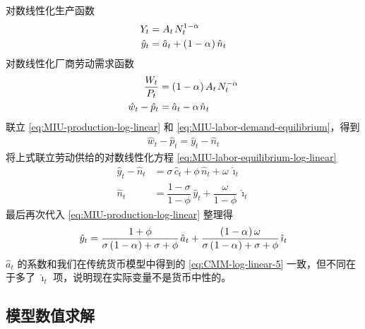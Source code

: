 对数线性化生产函数
\begin{align}
    Y_t&=A_t\,N_t^{1-\alpha}\notag\\
    \hat y_t&=\hat a_t+\bka{1-\alpha}\hat n_t\label{eq:MIU-production-log-linear}
\end{align}
对数线性化厂商劳动需求函数
\begin{align}
    \dfrac{W_t}{P_t}&=\bka{1-\alpha}A_t\,N^{-\alpha}_t\notag\\
    \hat w_t-\hat p_t&=\hat a_t-\alpha\,\hat n_t\label{eq:MIU-labor-demand-equilibrium}
\end{align}
联立 \ref{eq:MIU-production-log-linear} 和 \ref{eq:MIU-labor-demand-equilibrium}，得到
\begin{align}
    \hat w_t-\hat p_t=\hat y_t-\hat n_t\label{eq:MIU-production-labor-demand-log-linear}
\end{align}
将上式联立劳动供给的对数线性化方程 \ref{eq:MIU-labor-equilibrium-log-linear}
\begin{align*}
    \hat y_t-\hat n_t&=\sigma\,\hat c_t+\phi\,\hat n_t+\omega\,\hat\imath_t\\
    \hat n_t&=\dfrac{1-\sigma}{1-\phi}\,\hat y_t+\dfrac{\omega}{1-\phi}\,\hat\imath_t
\end{align*}
最后再次代入 \ref{eq:MIU-production-log-linear} 整理得
\begin{align*}
    \hat y_t=\dfrac{1+\phi}{\sigma\bka{1-\alpha}+\sigma+\phi}\,\hat a_t+\dfrac{\bka{1-\alpha}\omega}{\sigma\bka{1-\alpha}+\sigma+\phi}\,\hat\imath_t
\end{align*}
\(\hat a_t\) 的系数和我们在传统货币模型中得到的 \ref{eq:CMM-log-linear-5} 一致，但不同在于多了 \(\hat\imath_t\) 项，说明现在实际变量不是货币中性的。

\subsection{模型数值求解}

